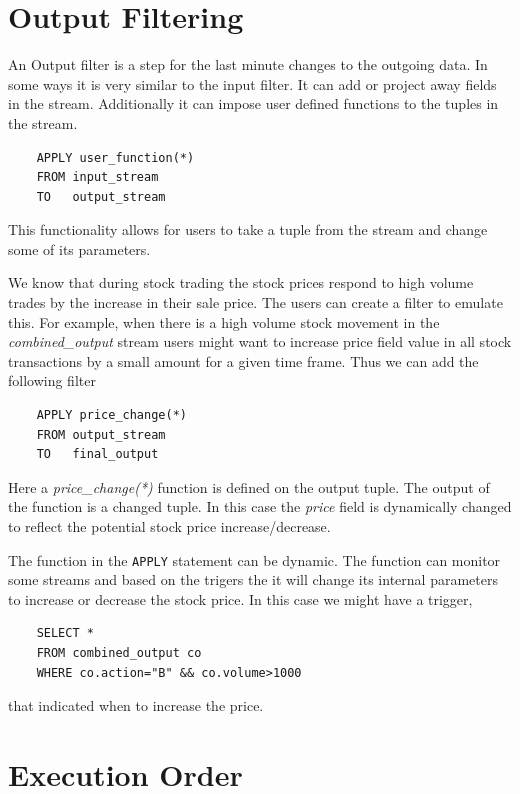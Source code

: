 \documentclass{article}
\begin{document}
\section{Output Filtering} 

An Output filter is a step for the last minute changes to the outgoing data. In some ways it is very similar to the input filter. It can add or project away fields in the stream. Additionally it can impose user defined functions to the tuples in the stream.

\begin{verbatim}
    APPLY user_function(*)
    FROM input_stream
    TO   output_stream 
\end{verbatim}

This functionality allows for users to take a tuple from the stream and change some of its parameters.

We know that during stock trading the stock prices respond to high volume trades by the increase in their sale price. The users can create a filter to emulate this. For example, when there is a high volume stock movement in the \emph{combined\_output} stream users might want to increase price field value in all stock transactions by a small amount for a given time frame. Thus we can add the following filter

\begin{verbatim}
    APPLY price_change(*)
    FROM output_stream
    TO   final_output 
\end{verbatim}

Here a \emph{price\_change(*)} function is defined on the output tuple. The output of the function is a changed tuple. In this case the \emph{price} field is dynamically changed to reflect the potential stock price increase/decrease.

The function in the {\tt APPLY} statement can be dynamic. The function can monitor some streams and based on the trigers the it will change its internal parameters to increase or decrease the stock price. In this case we might have a trigger, 

\begin{verbatim}
    SELECT *
    FROM combined_output co
    WHERE co.action="B" && co.volume>1000
\end{verbatim}

\noindent that indicated when to increase the price. 

\section{Execution Order}
\end{document}
